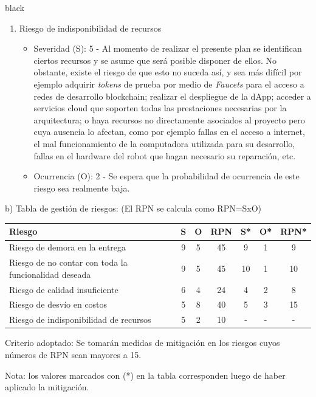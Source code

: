 \documentclass[
11pt, %
]{charter}
\begin{document}
\begin{consigna}{black}
\begin{enumerate}
\item Riesgo de indisponibilidad de recursos
\begin{itemize}
	\item Severidad (S): 5 - Al momento de realizar el presente plan se identifican ciertos recursos y se asume que será posible disponer de ellos. No obstante, existe el riesgo de que esto no suceda así, y sea más difícil por ejemplo adquirir \textit{tokens} de prueba por medio de \textit{Faucets} para el acceso a redes de desarrollo blockchain; realizar el despliegue de la dApp; acceder a servicios cloud que soporten todas las prestaciones necesarias por la arquitectura; o haya recursos no directamente asociados al proyecto pero cuya ausencia lo afectan, como por ejemplo fallas en el acceso a internet, el mal funcionamiento de la computadora utilizada para su desarrollo, fallas en el hardware del robot que hagan necesario su reparación, etc.
	\item Ocurrencia (O): 2 - Se espera que la probabilidad de ocurrencia de este riesgo sea realmente baja.
\end{itemize}

\end{enumerate}

b) Tabla de gestión de riesgos:      (El RPN se calcula como RPN=SxO)

\begin{table}[htpb]
\centering
\begin{tabularx}{\linewidth}{@{}|X|c|c|c|c|c|c|@{}}
\hline
\rowcolor[HTML]{C0C0C0}
Riesgo 													& S & O & RPN & S* & O* & RPN* \\ \hline
Riesgo de demora en la entrega							& 9 & 5 & 45 &	9  &  1  & 9    \\ \hline
Riesgo de no contar con toda la funcionalidad deseada		& 9 & 5 & 45 & 	10  & 1 &  10    \\ \hline
Riesgo de calidad insuficiente							& 6 & 4 & 24 &  	4 &  2 &   8  \\ \hline
Riesgo de desvío en costos								& 5 & 8 & 40 & 	5  & 3  &  15   \\ \hline
Riesgo de indisponibilidad de recursos					& 5 & 2 & 10 & 	-  & -  &   -   \\ \hline
\end{tabularx}%
\end{table}

Criterio adoptado:
Se tomarán medidas de mitigación en los riesgos cuyos números de RPN sean mayores a 15.

Nota: los valores marcados con (*) en la tabla corresponden luego de haber aplicado la mitigación.


\end{consigna}
\end{document}

